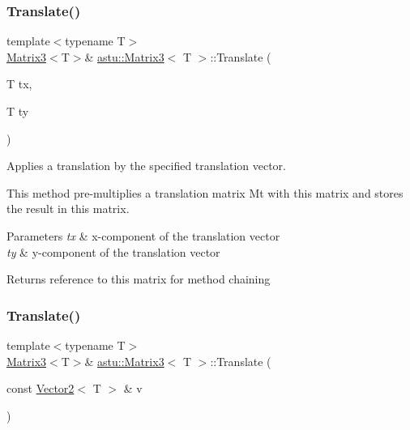 \subsubsection{\texorpdfstring{Translate()}{Translate()}\hspace{0.1cm}{\footnotesize\ttfamily [1/2]}}
{\footnotesize\ttfamily template$<$typename T$>$ \\
\hyperlink{classastu_1_1Matrix3}{Matrix3}$<$T$>$\& \hyperlink{classastu_1_1Matrix3}{astu\+::\+Matrix3}$<$ T $>$\+::Translate (\begin{DoxyParamCaption}\item[{T}]{tx,  }\item[{T}]{ty }\end{DoxyParamCaption})\hspace{0.3cm}{\ttfamily [inline]}}

Applies a translation by the specified translation vector.

This method pre-\/multiplies a translation matrix \textquotesingle{}Mt\textquotesingle{} with this matrix and stores the result in this matrix.


\begin{DoxyParams}{Parameters}
{\em tx} & x-\/component of the translation vector \\
\hline
{\em ty} & y-\/component of the translation vector \\
\hline
\end{DoxyParams}
\begin{DoxyReturn}{Returns}
reference to this matrix for method chaining 
\end{DoxyReturn}
\mbox{\label{classastu_1_1Matrix3_a75cee163cb06cdc5ef63dbac70e54250}} 
\subsubsection{\texorpdfstring{Translate()}{Translate()}\hspace{0.1cm}{\footnotesize\ttfamily [2/2]}}
{\footnotesize\ttfamily template$<$typename T$>$ \\
\hyperlink{classastu_1_1Matrix3}{Matrix3}$<$T$>$\& \hyperlink{classastu_1_1Matrix3}{astu\+::\+Matrix3}$<$ T $>$\+::Translate (\begin{DoxyParamCaption}\item[{const \hyperlink{classastu_1_1Vector2}{Vector2}$<$ T $>$ \&}]{v }\end{DoxyParamCaption})\hspace{0.3cm}{\ttfamily [inline]}}

